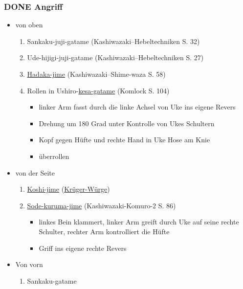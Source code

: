 \documentclass[11pt]{article}
\begin{document}
\subsubsection{{\bfseries\sffamily DONE} Angriff}
\label{sec:org0b04ed2}
\begin{itemize}
\item von oben
\begin{enumerate}
\item Sankaku-juji-gatame (Kashiwazaki--Hebeltechniken S. 32)
\item Ude-hijigi-juji-gatame (Kashiwazaki--Hebeltechniken S. 27)
\item \hyperref[orgaed2942]{Hadaka-jime} (Kashiwazaki--Shime-waza S. 58)
\item Rollen in Ushiro-\hyperref[org0fccb72]{kesa-gatame} (Komlock S. 104)
\begin{itemize}
\item linker Arm fasst durch die linke Achsel von Uke ins eigene Revers
\item Drehung um 180 Grad unter Kontrolle von Ukes Schultern
\item Kopf gegen Hüfte und rechte Hand in Uke Hose am Knie
\item überrollen
\end{itemize}
\end{enumerate}
\item von der Seite
\begin{enumerate}
\item \hyperref[orgce15c01]{Koshi-jime} (\hyperref[org8b732ab]{Krüger-Würge})
\item \hyperref[orgdc4236f]{Sode-kuruma-jime} (Kashiwazaki-Komuro-2 S. 86)
\begin{itemize}
\item linkes Bein klammert, linker Arm greift durch Uke auf seine rechte Schulter, rechter Arm kontrolliert die Hüfte
\item Griff ins eigene rechte Revers
\end{itemize}
\end{enumerate}
\item Von vorn
\begin{enumerate}
\item Sankaku-gatame
\end{enumerate}
\end{itemize}
\end{document}
